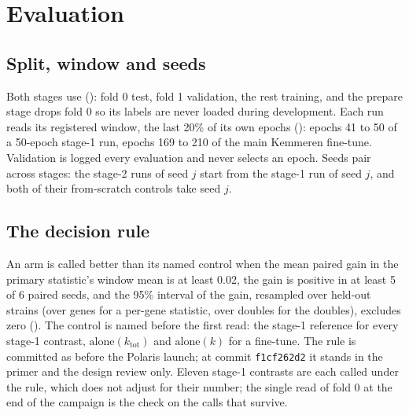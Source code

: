 
\section{Evaluation}
\label{sec:evaluation}

\subsection{Split, window and seeds}
\label{sec:evalsplit}

Both stages use  (): fold 0 test, fold 1
validation, the rest training, and the prepare stage drops fold 0 so its labels are never
loaded during development. Each run reads its registered window, the last 20\% of its own
epochs (): epochs 41 to 50 of a 50-epoch stage-1 run, epochs 169 to 210 of the main
Kemmeren fine-tune. Validation is logged every evaluation and never selects an epoch. Seeds
pair across stages: the stage-2 runs of seed $j$ start from the stage-1 run of seed $j$, and
both of their from-scratch controls take seed $j$.

\subsection{The decision rule}
\label{sec:rule}

An arm is called better than its named control when the mean paired gain in the primary
statistic's window mean is at least 0.02, the gain is positive in at least 5 of 6 paired
seeds, and the 95\% interval of the gain, resampled over held-out strains (over genes for a
per-gene statistic, over doubles for the doubles), excludes zero (). The control is
named before the first read: the stage-1 reference for every stage-1 contrast,
$\mathrm{alone}(k_{\mathrm{tot}})$ and $\mathrm{alone}(k)$ for a fine-tune. The rule is
committed as  before the Polaris launch; at commit
\texttt{f1cf262d2} it stands in the primer and the design review only. Eleven stage-1
contrasts are each called under the rule, which does not adjust for their number; the
single read of fold 0 at the end of the campaign is the check on the calls that survive.

